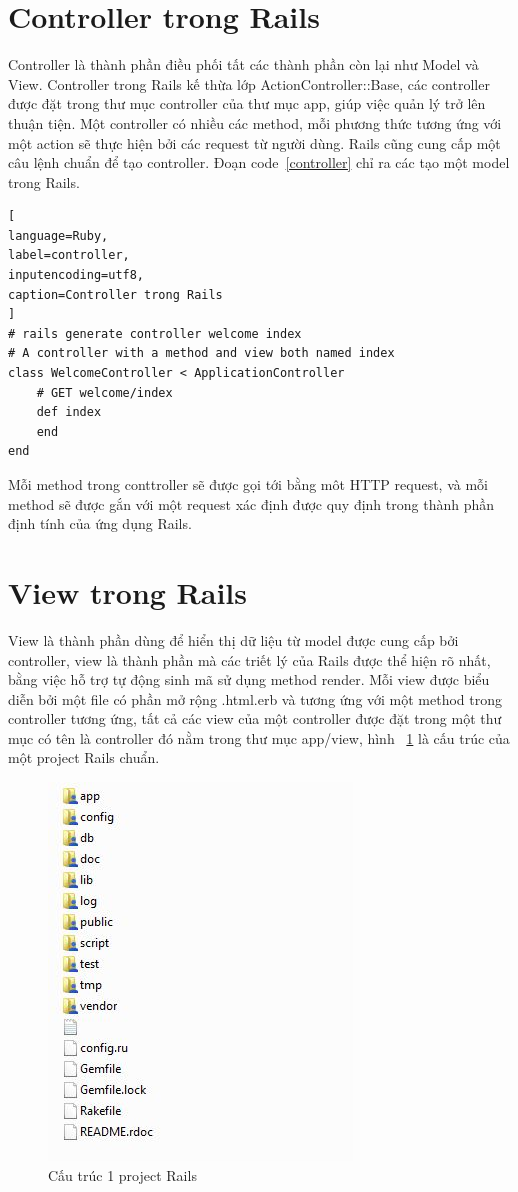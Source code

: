 \section{Controller trong Rails}
Controller là thành phần điều phối tất các thành phần còn lại như Model và View. Controller trong Rails kế thừa lớp ActionController::Base, các controller được đặt trong thư mục controller của thư mục app, giúp việc quản lý trở lên thuận tiện.
Một controller có nhiều các method, mỗi phương thức tương ứng với một action sẽ thực hiện bởi các request từ người dùng. Rails cũng cung cấp một câu lệnh chuẩn để tạo controller. Đoạn code~\ref{controller} chỉ ra các tạo một model trong Rails.

\begin{lstlisting}[
language=Ruby,
label=controller,
inputencoding=utf8,
caption=Controller trong Rails
]
# rails generate controller welcome index
# A controller with a method and view both named index 
class WelcomeController < ApplicationController
    # GET welcome/index
    def index
    end
end

\end{lstlisting}

Mỗi method trong conttroller sẽ được gọi tới bằng môt HTTP request, và mỗi method sẽ được gắn với một request xác định được quy định trong thành phần định tính của ứng dụng Rails.

\section{View trong Rails}
View là thành phần dùng để hiển thị dữ liệu từ model được cung cấp bởi controller, view là thành phần mà các triết lý của Rails được thể hiện rõ nhất, bằng việc hỗ trợ tự động sinh mã sử dụng method render.
Mỗi view được biểu diễn bởi một file có phần mở rộng .html.erb và tương ứng với một method trong controller tương ứng, tất cả các view của một controller được đặt trong một thư mục có tên là controller đó nằm trong thư mục app/view, hình ~\ref{fig:d} là cấu trúc của một project Rails chuẩn.
\begin{figure}
	\centering
		\includegraphics{image/d.JPG}
	\caption{Cấu trúc 1 project Rails}
	\label{fig:d}
\end{figure}

